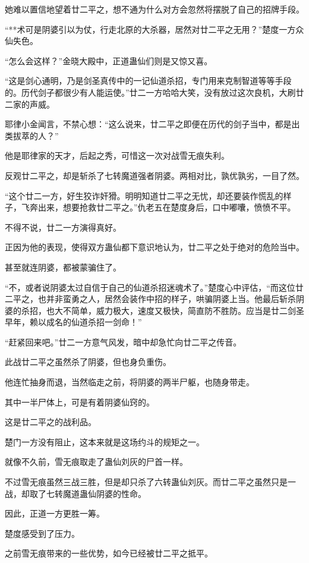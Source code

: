 \begin{this_body}
她难以置信地望着廿二平之，想不通为什么对方会忽然将摆脱了自己的招牌手段。

“**术可是阴婆引以为仗，行走北原的大杀器，居然对廿二平之无用？”楚度一方众仙失色。

“怎么会这样？”金晓大殿中，正道蛊仙们则是又惊又喜。

“这是剑心通明，乃是剑圣真传中的一记仙道杀招，专门用来克制智道等等手段的。历代剑子都很少有人能运使。”廿二一方哈哈大笑，没有放过这次良机，大刷廿二家的声威。

耶律小金闻言，不禁心想：“这么说来，廿二平之即便在历代的剑子当中，都是出类拔萃的人？”

他是耶律家的天才，后起之秀，可惜这一次对战雪无痕失利。

反观廿二平之，却是斩杀了七转魔道强者阴婆。两相对比，孰优孰劣，一目了然。

“这个廿二一方，好生狡诈奸猾。明明知道廿二平之无忧，却还要装作慌乱的样子，飞奔出来，想要抢救廿二平之。”仇老五在楚度身后，口中嘟囔，愤愤不平。

不得不说，廿二一方演得真好。

正因为他的表现，使得双方蛊仙都下意识地认为，廿二平之处于绝对的危险当中。

甚至就连阴婆，都被蒙骗住了。

“不，或者说阴婆太过自信于自己的仙道杀招迷魂术了。”楚度心中评估，“而这位廿二平之，也并非蛮勇之人，居然会装作中招的样子，哄骗阴婆上当。他最后斩杀阴婆的杀招，也大不简单，威力极大，速度又极快，简直防不胜防。应当是廿二剑圣早年，赖以成名的仙道杀招一剑命！”

“赶紧回来吧。”廿二一方意气风发，暗中却急忙向廿二平之传音。

此战廿二平之虽然杀了阴婆，但也身负重伤。

他连忙抽身而退，当然临走之前，将阴婆的两半尸躯，也随身带走。

其中一半尸体上，可是有着阴婆仙窍的。

这是廿二平之的战利品。

楚门一方没有阻止，这本来就是这场约斗的规矩之一。

就像不久前，雪无痕取走了蛊仙刘灰的尸首一样。

不过雪无痕虽然三战三胜，但是却只杀了六转蛊仙刘灰。而廿二平之虽然只是一战，却取了七转魔道蛊仙阴婆的性命。

因此，正道一方更胜一筹。

楚度感受到了压力。

之前雪无痕带来的一些优势，如今已经被廿二平之抵平。


\end{this_body}
